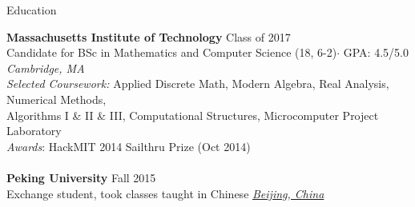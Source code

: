 \documentclass{resume} %
\begin{document}

\begin{rSection}{Education}

{\bf Massachusetts Institute of Technology} \hfill Class of 2017
\\ Candidate for BSc in Mathematics and Computer Science (18, 6-2)$\cdot$ GPA: 4.5/5.0 \hfill {\em Cambridge, MA}
\\ {\em Selected Coursework:} 
Applied Discrete Math, Modern Algebra, Real Analysis, Numerical Methods,
\\Algorithms I \& II \& III, Computational Structures, Microcomputer Project Laboratory
\\ {\em Awards}: HackMIT 2014 Sailthru Prize (Oct 2014)
\\
\\ {\bf Peking University} \hfill Fall 2015
\\ Exchange student, took classes taught in Chinese  \hfill \underline{\em Beijing, China}

\end{rSection}

\end{document}
